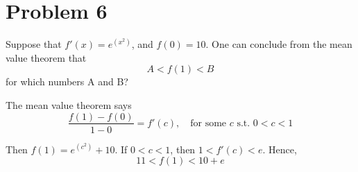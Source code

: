 \documentclass{article}
\begin{document}
\section{Problem 6}
\begin{tcolorbox}
    Suppose that $f'(x) =  e^{(x^2)}$, and $f(0)=10$. One can conclude from the mean value theorem that
    \[ A < f(1) < B \]
    for which numbers A and B? 
\end{tcolorbox}
The mean value theorem says
\[ \frac{f(1) - f(0)}{1 - 0} = f'(c), \quad \text{for some $c$ s.t. $0 < c < 1$} \]
\par Then $f(1) = e^{(c^2)} + 10$. If $0 < c < 1$, then $1 < f'(c) < e$. Hence, 
\[ 11 < f(1) < 10 + e \]
\end{document}
